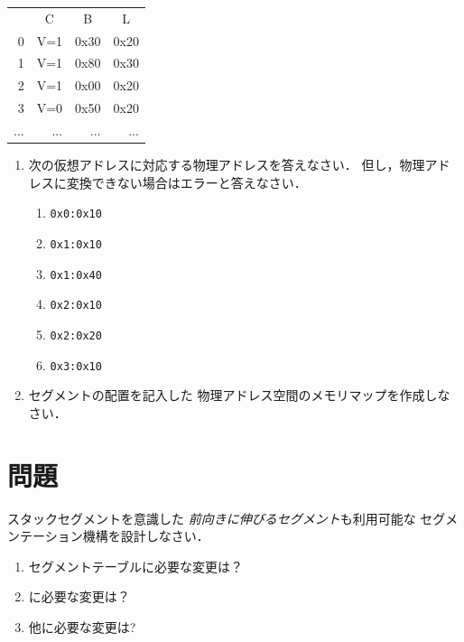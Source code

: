 \begin{center}
\begin{tabular}{r |r|r|r|}
\multicolumn{1}{c}{} &
\multicolumn{1}{c}{C} &
\multicolumn{1}{c}{B} &
\multicolumn{1}{c}{L} \\
\cline{2-4}
0   & V=1 & 0x30 & 0x20 \\
1   & V=1 & 0x80 & 0x30 \\
2   & V=1 & 0x00 & 0x20 \\
3   & V=0 & 0x50 & 0x20 \\
... & ... & ... & ... \\
\cline{2-4}
\end{tabular}
\end{center}

\begin{enumerate}
\item 次の仮想アドレスに対応する物理アドレスを答えなさい．
  但し，物理アドレスに変換できない場合はエラーと答えなさい．
  \begin{enumerate}
    \item \texttt{0x0:0x10}
    \item \texttt{0x1:0x10}
    \item \texttt{0x1:0x40}
    \item \texttt{0x2:0x10}
    \item \texttt{0x2:0x20}
    \item \texttt{0x3:0x10}
  \end{enumerate}
\item セグメントの配置を記入した
物理アドレス空間のメモリマップを作成しなさい．
\end{enumerate}

\section*{問題}
スタックセグメントを意識した
\emph{前向きに伸びるセグメント}も利用可能な
セグメンテーション機構を設計しなさい．

\begin{enumerate}
\item セグメントテーブルに必要な変更は？
\item {}に必要な変更は？
\item 他に必要な変更は?
\end{enumerate}
